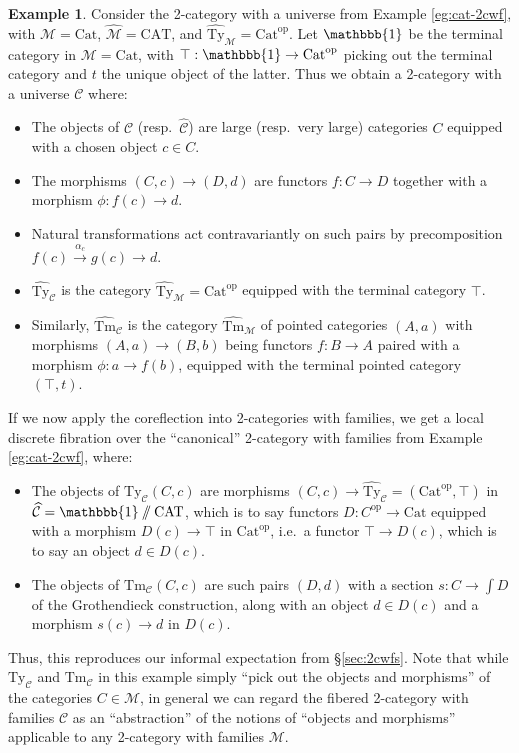 \documentclass[10pt]{article}
\theoremstyle{definition}
\newtheorem{example}{Example}
\newcommand\op{^{\mathrm{op}}}
\newcommand\Cat{\mathrm{Cat}}
\newcommand\CAT{\mathrm{CAT}}
\newcommand\M{\mathcal{M}}
\newcommand\Mhat{\widehat{\mathcal{M}}}
\newcommand\Mtyhat{{\widehat{\mathrm{Ty}}_{\M}}}
\newcommand\Mtmhat{{\widehat{\mathrm{Tm}}_{\M}}}
\newcommand\C{\mathcal{C}}
\newcommand\Chat{{\widehat{\mathcal{C}}}}
\newcommand\Cty{\mathrm{Ty}_{\C}}
\newcommand\Ctm{\mathrm{Tm}_{\C}}
\newcommand\Ctyhat{{\widehat{\mathrm{Ty}}}_{\C}}
\newcommand\Ctmhat{{\widehat{\mathrm{Tm}}}_{\C}}
\newcommand\one{\mathbbb{1}}
\begin{document}
\begin{example}
  Consider the 2-category with a universe from Example \ref{eg:cat-2cwf}, with $\M=\Cat$, $\Mhat = \CAT$, and $\Mtyhat = \Cat\op$.
  Let $\one$ be the terminal category in $\M=\Cat$, with $\top:\one \to \Cat\op$ picking out the terminal category and $t$ the unique object of the latter.
  Thus we obtain a 2-category with a universe $\C$ where:
  \begin{itemize}
  \item The objects of $\C$ (resp.\ $\Chat$) are large (resp.\ very large) categories $C$ equipped with a chosen object $c\in C$.
  \item The morphisms $(C,c) \to (D,d)$ are functors $f:C\to D$ together with a morphism $\phi :f(c) \to d$.
  \item Natural transformations act contravariantly on such pairs by precomposition $f(c) \xrightarrow{\alpha_c} g(c) \to d$.
  \item $\Ctyhat$ is the category $\Mtyhat = \Cat\op$ equipped with the terminal category $\top$.
  \item Similarly, $\Ctmhat$ is the category $\Mtmhat$ of pointed categories $(A,a)$ with morphisms $(A,a) \to (B,b)$ being functors $f:B\to A$ paired with a morphism $\phi : a\to f(b)$, equipped with the terminal pointed category $(\top,t)$.
  \end{itemize}
  If we now apply the coreflection into 2-categories with families, we get a local discrete fibration over the ``canonical'' 2-category with families from Example \ref{eg:cat-2cwf}, where:
  \begin{itemize}
  \item The objects of $\Cty(C,c)$ are morphisms $(C,c) \to \Ctyhat = (\Cat\op,\top)$ in $\Chat = \one\sslash\CAT$, which is to say functors $D:C\op\to \Cat$ equipped with a morphism $D(c) \to \top$ in $\Cat\op$, i.e.\ a functor $\top \to D(c)$, which is to say an object $d\in D(c)$.
  \item The objects of $\Ctm(C,c)$ are such pairs $(D,d)$ with a section $s:C\to \int D$ of the Grothendieck construction, along with an object $d\in D(c)$ and a morphism $s(c) \to d$ in $D(c)$.
  \end{itemize}
  Thus, this reproduces our informal expectation from \S\ref{sec:2cwfs}.
  Note that while $\Cty$ and $\Ctm$ in this example simply ``pick out the objects and morphisms'' of the categories $C\in\M$, in general we can regard the fibered 2-category with families $\C$ as an ``abstraction'' of the notions of ``objects and morphisms'' applicable to any 2-category with families $\M$.
\end{example}
\end{document}
